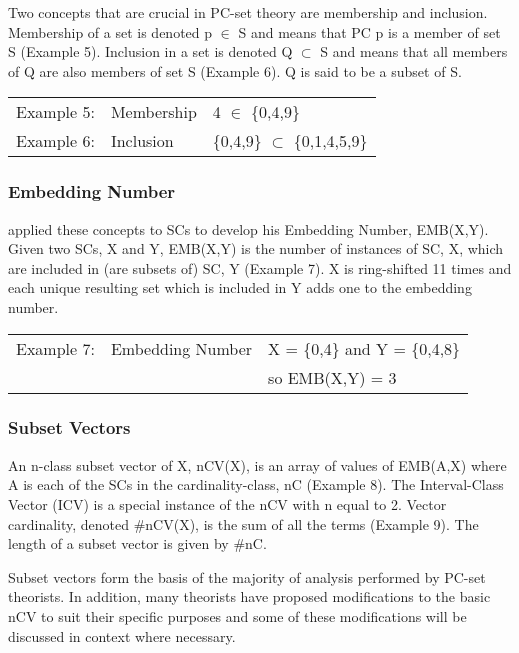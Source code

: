 \documentclass{article}
\begin{document}
Two concepts that are crucial in PC-set theory are membership and
inclusion. Membership of a set is denoted p $\in$ S and means that PC p
is a member of set S (Example 5). Inclusion in a set is denoted Q
$\subset$ S and means that all members of Q are also members of set S
(Example 6). Q is said to be a subset of S.

\begin{center}
\begin{tabular}{lll}
 Example 5:  &  Membership  &  4 $\in$ \{0,4,9\}                  \\
 Example 6:  &  Inclusion   &  \{0,4,9\} $\subset$ \{0,1,4,5,9\}  \\
\end{tabular}
\end{center}
\subsubsection{Embedding Number}
\label{sec-3-3-2}

\citet{Lewin1979} applied these concepts to SCs to develop his
Embedding Number, EMB(X,Y). Given two SCs, X and Y, EMB(X,Y) is the
number of instances of SC, X, which are included in (are subsets of)
SC, Y (Example 7). X is ring-shifted 11 times and each unique
resulting set which is included in Y adds one to the embedding number.

\begin{center}
\begin{tabular}{lll}
 Example 7:  &  Embedding Number  &  X = \{0,4\} and Y = \{0,4,8\}  \\
             &                    &  so EMB(X,Y) = 3                \\
\end{tabular}
\end{center}
\subsubsection{Subset Vectors}
\label{sec-3-3-3}

An n-class subset vector of X, nCV(X), is an array of values of
EMB(A,X) where A is each of the SCs in the cardinality-class, nC
(Example 8). The Interval-Class Vector (ICV) is a special instance of
the nCV with n equal to 2. Vector cardinality, denoted \#nCV(X), is the
sum of all the terms (Example 9). The length of a subset vector is
given by \#nC.

Subset vectors form the basis of the majority of analysis performed
by PC-set theorists. In addition, many theorists have proposed
modifications to the basic nCV to suit their specific purposes and
some of these modifications will be discussed in context where
necessary.
\end{document}
